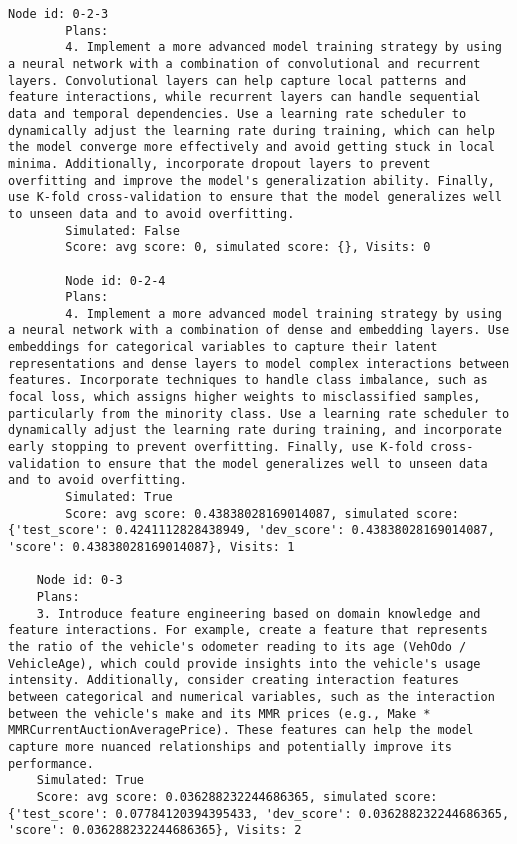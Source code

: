 \begin{lstlisting}[style=txtfile]
		Node id: 0-2-3
		Plans: 
		4. Implement a more advanced model training strategy by using a neural network with a combination of convolutional and recurrent layers. Convolutional layers can help capture local patterns and feature interactions, while recurrent layers can handle sequential data and temporal dependencies. Use a learning rate scheduler to dynamically adjust the learning rate during training, which can help the model converge more effectively and avoid getting stuck in local minima. Additionally, incorporate dropout layers to prevent overfitting and improve the model's generalization ability. Finally, use K-fold cross-validation to ensure that the model generalizes well to unseen data and to avoid overfitting.
		Simulated: False
		Score: avg score: 0, simulated score: {}, Visits: 0

		Node id: 0-2-4
		Plans: 
		4. Implement a more advanced model training strategy by using a neural network with a combination of dense and embedding layers. Use embeddings for categorical variables to capture their latent representations and dense layers to model complex interactions between features. Incorporate techniques to handle class imbalance, such as focal loss, which assigns higher weights to misclassified samples, particularly from the minority class. Use a learning rate scheduler to dynamically adjust the learning rate during training, and incorporate early stopping to prevent overfitting. Finally, use K-fold cross-validation to ensure that the model generalizes well to unseen data and to avoid overfitting.
		Simulated: True
		Score: avg score: 0.43838028169014087, simulated score: {'test_score': 0.4241112828438949, 'dev_score': 0.43838028169014087, 'score': 0.43838028169014087}, Visits: 1

	Node id: 0-3
	Plans: 
	3. Introduce feature engineering based on domain knowledge and feature interactions. For example, create a feature that represents the ratio of the vehicle's odometer reading to its age (VehOdo / VehicleAge), which could provide insights into the vehicle's usage intensity. Additionally, consider creating interaction features between categorical and numerical variables, such as the interaction between the vehicle's make and its MMR prices (e.g., Make * MMRCurrentAuctionAveragePrice). These features can help the model capture more nuanced relationships and potentially improve its performance.
	Simulated: True
	Score: avg score: 0.036288232244686365, simulated score: {'test_score': 0.07784120394395433, 'dev_score': 0.036288232244686365, 'score': 0.036288232244686365}, Visits: 2


\end{lstlisting}
